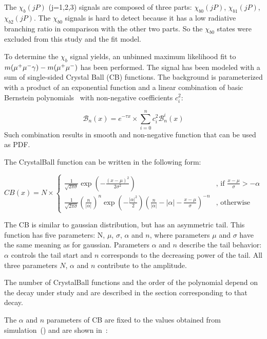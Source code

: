 The $\chi_b(jP)$ (j=1,2,3) signals are composed of three parts: $\chi_{b0}(jP)$,
$\chi_{b1}(jP)$, $\chi_{b2}(jP)$. The $\chi_{b0}$ signals is hard to detect
because it has a low radiative branching ratio in comparison with the other two
parts. So the $\chi_{b0}$ states were excluded from this study and the fit
model.

To determine the $\chi_b$ signal yields, an unbinned maximum likelihood fit to
$m(\mu^+\mu^-\gamma) - m(\mu^+\mu^-)$ has been performed. The signal has been modeled with
a sum of single-sided Crystal Ball (CB)  functions. The background is parameterized with a
product of an exponential function and a linear combination of basic Bernstein
polynomials~\cite{Phillips:2003} with non-negative coefficients $c_{i}^2$:

\begin{equation}
\label{eq:bernstein}
{\mathscr B}_{n}(x) = e^{-\tau x} \times \sum_{i=0}^{n} c_{i}^2 {\mathscr B}_{n}^{i}(x)
\end{equation}
Such combination results in smooth and non-negative function that can be used as
PDF.

The CrystalBall function can be written in the following form:

\begin{equation}
CB(x) = N \times
\begin{cases}
\frac{1}{\sqrt{2\pi\sigma}}\exp(-\frac{{(x-\mu)}^2}{2\sigma^2}) & \text{, if $\frac{x-\mu}{\sigma} > -\alpha$} \\
\frac{1}{\sqrt{2\pi\sigma}}{(\frac{n}{|\alpha|})}^n \exp(-\frac{|\alpha|^2}{2}){(\frac{n}{|\alpha|}-|\alpha|-\frac{x-\mu}{\sigma})}^{-n} & \text{, otherwise}
\end{cases}
\label{eq:cb}
\end{equation}

The CB is similar to gaussian distribution, but has an asymmetric tail. This
function has five parameters: N, $\mu$, $\sigma$, $\alpha$ and $n$, where
parameters $\mu$ and $\sigma$ have the same meaning as for gaussian. Parameters
$\alpha$ and $n$ describe the tail behavior: $\alpha$ controls the tail start
and $n$ corresponds to the decreasing power of the tail. All three parameters
$N$, $\alpha$ and $n$ contribute to the amplitude.

The number of CrystalBall functions and the order of the polynomial depend on
the decay under study and are described in the section corresponding to that
decay.


The $\alpha$ and $n$
parameters of CB are fixed to the values obtained from simulation~()
and are shown in~:


